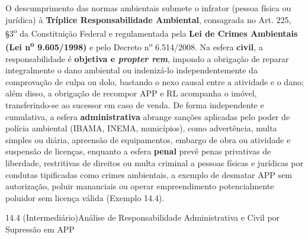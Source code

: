 O descumprimento das normas ambientais submete o infrator (pessoa física ou jurídica) à \textbf{Tríplice Responsabilidade Ambiental}, consagrada no Art. 225, \S 3\textsuperscript{o} da Constituição Federal e regulamentada pela \textbf{Lei de Crimes Ambientais (Lei n\textsuperscript{o} 9.605/1998)} e pelo Decreto n\textsuperscript{o} 6.514/2008. Na esfera \textbf{civil}, a responsabilidade é \textbf{objetiva e \textit{propter rem}}, impondo a obrigação de reparar integralmente o dano ambiental ou indenizá-lo independentemente da comprovação de culpa ou dolo, bastando o nexo causal entre a atividade e o dano; além disso, a obrigação de recompor APP e RL acompanha o imóvel, transferindo-se ao sucessor em caso de venda. De forma independente e cumulativa, a esfera \textbf{administrativa} abrange sanções aplicadas pelo poder de polícia ambiental (IBAMA, INEMA, municípios), como advertência, multa simples ou diária, apreensão de equipamentos, embargo de obra ou atividade e suspensão de licenças, enquanto a esfera \textbf{penal} prevê penas privativas de liberdade, restritivas de direitos ou multa criminal a pessoas físicas e jurídicas por condutas tipificadas como crimes ambientais, a exemplo de desmatar APP sem autorização, poluir mananciais ou operar empreendimento potencialmente poluidor sem licença válida (Exemplo 14.4).

\begin{boxExemplo}{14.4 (Intermediário)}{Análise de Responsabilidade Administrativa e Civil por Supressão em APP}
\end{boxExemplo}

